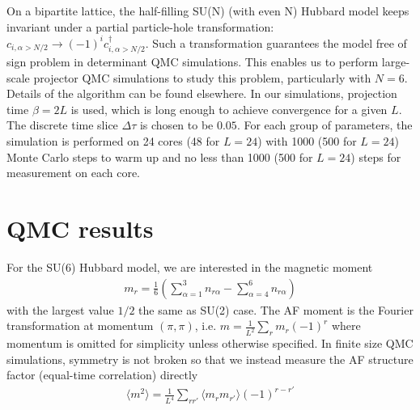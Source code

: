 \documentclass[twocolumn,superscriptaddress]{revtex4-1}
\begin{document}
On a bipartite lattice, the half-filling SU(N) (with even N) Hubbard model keeps invariant under a partial particle-hole transformation: $c_{i,\alpha>N/2}\rightarrow(-1)^i c_{i,\alpha>N/2}^\dag$. Such a transformation guarantees the model free of sign problem in determinant QMC simulations. \cite{Wu2005a} This enables us to perform large-scale projector QMC simulations to study this problem, particularly with $N=6$. Details of the algorithm can be found elsewhere. \cite{Assaad2008,Wang2014b,Zhou2016} In our simulations, projection time $\beta=2L$ is used, which is long enough to achieve convergence for a given $L$. The discrete time slice $\Delta\tau$ is chosen to be $0.05$. For each group of parameters, the simulation is performed on 24 cores (48 for $L=24$) with 1000 (500 for $L=24$) Monte Carlo steps to warm up and no less than 1000 (500 for $L=24$) steps for measurement on each core. 



\section{QMC results}




For the SU(6) Hubbard model, we are interested in the magnetic moment 
\begin{eqnarray}
  m_r=\frac{1}{6}\left( \sum_{\alpha=1}^{3}n_{r\alpha} -\sum_{\alpha=4}^{6}n_{r\alpha} \right)
\end{eqnarray}
with the largest value $1/2$ the same as SU(2) case. The AF moment is the Fourier transformation at momentum $(\pi,\pi)$, i.e. $m=\frac{1}{L^2}\sum_{r}m_r(-1)^r$ where momentum is omitted for simplicity unless otherwise specified. In finite size QMC simulations, symmetry is not broken so that we instead measure the AF structure factor (equal-time correlation) directly
\begin{eqnarray}
  \langle m^2 \rangle=\frac{1}{L^4}\sum_{rr'}\langle m_rm_{r'}\rangle (-1)^{r-r'}
\end{eqnarray}
\end{document}
